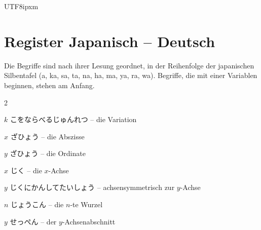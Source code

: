 \begin{CJK}{UTF8}{ipxm}
\newpage
\section{Register Japanisch -- Deutsch}\renewcommand{\lesenabstand}{1.12}\renewcommand{\arraystretch}{0.93}

Die Begriffe sind nach ihrer Lesung geordnet, in der Reihenfolge der japanischen Silbentafel
(a, ka, sa, ta, na, ha, ma, ya, ra, wa). Begriffe, die mit einer Variablen beginnen, stehen am Anfang.

\begin{multicols}{2}\small\raggedright\raggedcolumns

\par\nopagebreak
{} {\footnotesize\color{black!70}$k$ こをならべるじゅんれつ} -- die Variation\dotfill\hyperref[e:342]{\pageref*{e:342}}\par
{} {\footnotesize\color{black!70}$x$ ざひょう} -- die Abszisse\dotfill\hyperref[e:117]{\pageref*{e:117}}\par
{} {\footnotesize\color{black!70}$y$ ざひょう} -- die Ordinate\dotfill\hyperref[e:118]{\pageref*{e:118}}\par
{} {\footnotesize\color{black!70}$x$ じく} -- die $x$-Achse\dotfill\hyperref[e:114]{\pageref*{e:114}}\par
{} {\footnotesize\color{black!70}$y$ じくにかんしてたいしょう} -- achsensymmetrisch zur $y$-Achse\dotfill\hyperref[e:144]{\pageref*{e:144}}\par
{} {\footnotesize\color{black!70}$n$ じょうこん} -- die $n$-te Wurzel\dotfill\hyperref[e:47]{\pageref*{e:47}}\par
{} {\footnotesize\color{black!70}$y$ せっぺん} -- der $y$-Achsenabschnitt\dotfill\hyperref[e:121]{\pageref*{e:121}}\par


\end{multicols}
\end{CJK}
